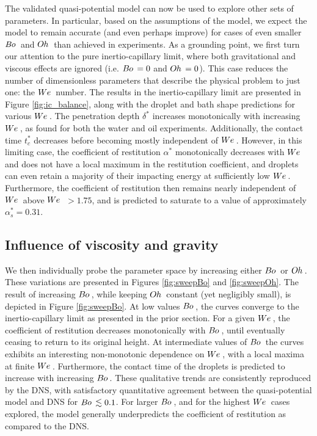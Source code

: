 \documentclass{jfm}
\begin{document}
The validated quasi-potential model can now be used to explore other sets of parameters.  In particular, based on the assumptions of the model, we expect the model to remain accurate (and even perhaps improve) for cases of even smaller $B\kern-0.04em o\,$ and $O\kern-0.04em h\,$ than achieved in experiments.  As a grounding point, we first turn our attention to the pure inertio-capillary limit, where both gravitational and viscous effects are ignored (i.e. $B\kern-0.04em o\,=0$ and $O\kern-0.04em h\,=0$).  This case reduces the number of dimensionless parameters that describe the physical problem to just one: the $W\kern-0.03em e\,$ number. The results in the inertio-capillary limit are presented in Figure \ref{fig:ic_balance}, along with the droplet and bath shape predictions for various $W\kern-0.03em e\,$. The penetration depth $\delta^*$ increases monotonically with increasing $W\kern-0.03em e\,$, as found for both the water and oil experiments. Additionally, the contact time $t_c^*$ decreases before becoming mostly independent of $W\kern-0.03em e\,$. However, in this limiting case, the coefficient of restitution $\alpha^*$ monotonically decreases with $W\kern-0.03em e\,$ and does not have a local maximum in the restitution coefficient, and droplets can even retain a majority of their impacting energy at sufficiently low $W\kern-0.03em e\,$. Furthermore, the coefficient of restitution then remains nearly independent of $W\kern-0.03em e\,$ above $W\kern-0.03em e\,$ $>1.75$, and is predicted to saturate to a value of approximately $\alpha_{s}^* = 0.31$.


\subsection{Influence of viscosity and gravity}
We then individually probe the parameter space by increasing either $B\kern-0.04em o\,$ or $O\kern-0.04em h\,$. These variations are presented in Figures \ref{fig:sweepBo} and \ref{fig:sweepOh}. The result of increasing $B\kern-0.04em o\,$, while keeping $O\kern-0.04em h\,$ constant (yet negligibly small), is depicted in Figure \ref{fig:sweepBo}.  At low values $B\kern-0.04em o\,$, the curves converge to the inertio-capillary limit as presented in the prior section.  For a given $W\kern-0.03em e\,$, the coefficient of restitution decreases monotonically with $B\kern-0.04em o\,$, until eventually ceasing to return to its original height.  At intermediate values of $B\kern-0.04em o\,$ the curves exhibits an interesting non-monotonic dependence on $W\kern-0.03em e\,$, with a local maxima at finite $W\kern-0.03em e\,$. Furthermore, the contact time of the droplets is predicted to increase with increasing $B\kern-0.04em o\,$. These qualitative trends are consistently reproduced by the DNS, with satisfactory quantitative agreement between the quasi-potential model and DNS for $B\kern-0.04em o\, \lesssim 0.1$.  For larger $B\kern-0.04em o\,$, and for the highest $W\kern-0.03em e\,$ cases explored, the model generally underpredicts the coefficient of restitution as compared to the DNS.
 
\end{document}

